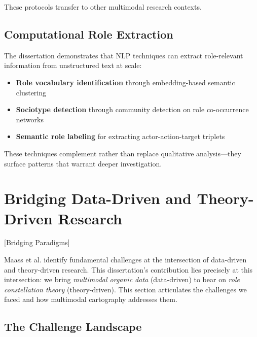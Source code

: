 \documentclass[../main.tex]{subfiles}
\begin{document}
These protocols transfer to other multimodal research contexts.

\subsection{Computational Role Extraction}

The dissertation demonstrates that NLP techniques can extract role-relevant information from unstructured text at scale:

\begin{itemize}[leftmargin=*, itemsep=0.3em]
\item \textbf{Role vocabulary identification} through embedding-based semantic clustering
\item \textbf{Sociotype detection} through community detection on role co-occurrence networks
\item \textbf{Semantic role labeling} for extracting actor-action-target triplets
\end{itemize}

These techniques complement rather than replace qualitative analysis---they surface patterns that warrant deeper investigation.


\section{Bridging Data-Driven and Theory-Driven Research}[Bridging Paradigms]

Maass et al. \citeyear{maass2018data} identify fundamental challenges at the intersection of data-driven and theory-driven research. This dissertation's contribution lies precisely at this intersection: we bring \emph{multimodal organic data} (data-driven) to bear on \emph{role constellation theory} (theory-driven). This section articulates the challenges we faced and how multimodal cartography addresses them.

\subsection{The Challenge Landscape}
\end{document}
